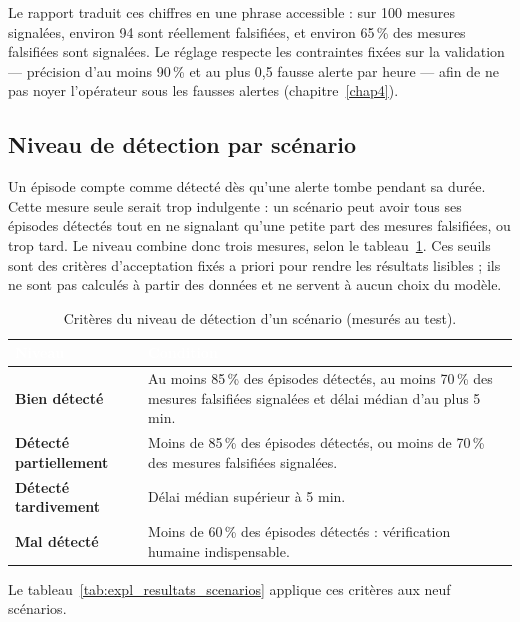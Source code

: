 Le rapport traduit ces chiffres en une phrase accessible : sur 100 mesures
signalées, environ 94 sont réellement falsifiées, et environ 65\,\% des
mesures falsifiées sont signalées. Le réglage respecte les contraintes fixées
sur la validation — précision d'au moins 90\,\% et au plus 0,5 fausse alerte
par heure — afin de ne pas noyer l'opérateur sous les fausses alertes
(chapitre~\ref{chap4}).

\subsection{Niveau de détection par scénario}

Un épisode compte comme détecté dès qu'une alerte tombe pendant sa durée.
Cette mesure seule serait trop indulgente : un scénario peut avoir tous ses
épisodes détectés tout en ne signalant qu'une petite part des mesures
falsifiées, ou trop tard. Le niveau combine donc trois mesures, selon le
tableau~\ref{tab:expl_niveaux}. Ces seuils sont des critères d'acceptation
fixés a priori pour rendre les résultats lisibles ; ils ne sont pas calculés
à partir des données et ne servent à aucun choix du modèle.

\begin{table}[H]
\centering
\small
\renewcommand{\arraystretch}{1.35}
\caption{Critères du niveau de détection d'un scénario (mesurés au test).}
\label{tab:expl_niveaux}
\begin{tabularx}{\textwidth}{@{}|>{\bfseries}p{4.2cm}|>{\raggedright\arraybackslash}X|@{}}
\hline
\rowcolor{thead}
\textcolor{white}{\textbf{Niveau}} & \textcolor{white}{\textbf{Condition}} \\
\hline
Bien détecté & Au moins 85\,\% des épisodes détectés, au moins 70\,\% des
mesures falsifiées signalées et délai médian d'au plus 5 min. \\
\hline
\rowcolor{trowa}
Détecté partiellement & Moins de 85\,\% des épisodes détectés, ou moins de
70\,\% des mesures falsifiées signalées. \\
\hline
Détecté tardivement & Délai médian supérieur à 5 min. \\
\hline
\rowcolor{trowa}
Mal détecté & Moins de 60\,\% des épisodes détectés : vérification humaine
indispensable. \\
\hline
\end{tabularx}
\end{table}

Le tableau~\ref{tab:expl_resultats_scenarios} applique ces critères aux
neuf scénarios.

